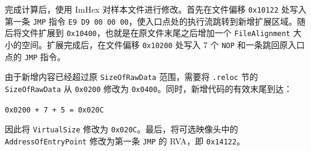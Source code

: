 ﻿\documentclass[12pt]{ctexart}
\begin{document}
完成计算后，使用 ImHex 对样本文件进行修改。首先在文件偏移 \texttt{0x10122} 处写入第一条 \texttt{JMP} 指令 \texttt{E9 D9 00 00 00}，使入口点处的执行流跳转到新增扩展区域。随后将文件扩展到 \texttt{0x10400}，也就是在原文件末尾之后增加一个 \texttt{FileAlignment} 大小的空间。扩展完成后，在文件偏移 \texttt{0x10200} 处写入 7 个 \texttt{NOP} 和一条跳回原入口点的 \texttt{JMP} 指令。

由于新增内容已经超过原 \texttt{SizeOfRawData} 范围，需要将 \texttt{.reloc} 节的 \texttt{SizeOfRawData} 从 \texttt{0x0200} 修改为 \texttt{0x0400}。同时，新增代码的有效末尾到达：

\begin{center}
\texttt{0x0200 + 7 + 5 = 0x020C}
\end{center}

因此将 \texttt{VirtualSize} 修改为 \texttt{0x020C}。最后，将可选映像头中的 \texttt{AddressOfEntryPoint} 修改为第一条 \texttt{JMP} 的 RVA，即 \texttt{0x14122}。
\end{document}
